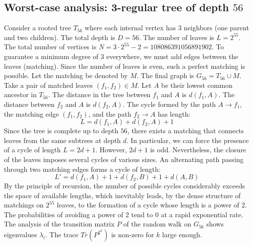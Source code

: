 \documentclass[11pt,a4paper]{article}
\begin{document}
\subsection{Worst-case analysis: 3-regular tree of depth $56$}
Consider a rooted tree $T_{56}$ where each internal vertex has 3 neighbors (one parent and two children).
The total depth is $D = 56$.
The number of leaves is $L = 2^{55}$.
The total number of vertices is $N = 3 \cdot 2^{55} - 2 = 108086391056891902$.
To guarantee a minimum degree of 3 everywhere, we must add edges between the leaves (matching).
Since the number of leaves is even, such a perfect matching is possible.
Let the matching be denoted by $M$. The final graph is $G_{56} = T_{56} \cup M$.
Take a pair of matched leaves $(f_1, f_2) \in M$.
Let $A$ be their lowest common ancestor in $T_{56}$.
The distance in the tree between $f_1$ and $A$ is $d(f_1, A)$.
The distance between $f_2$ and $A$ is $d(f_2, A)$.
The cycle formed by the path $A \to f_1$, the matching edge $(f_1, f_2)$, and the path $f_2 \to A$ has length:
$$ L = d(f_1, A) + d(f_2, A) + 1 $$
Since the tree is complete up to depth $56$, there exists a matching that connects leaves from the same subtrees at depth $d$.
In particular, we can force the presence of a cycle of length $L = 2d + 1$. However, $2d+1$ is odd.
Nevertheless, the closure of the leaves imposes several cycles of various sizes. An alternating path passing through two matching edges forms a cycle of length:
$$ L' = d(f_1, A) + 1 + d(f_2, B) + 1 + d(A, B) $$
By the principle of recursion, the number of possible cycles considerably exceeds the space of available lengths, which inevitably leads, by the dense structure of matchings on $2^{55}$ leaves, to the formation of a cycle whose length is a power of 2. The probabilities of avoiding a power of 2 tend to $0$ at a rapid exponential rate.
The analysis of the transition matrix $P$ of the random walk on $G_{56}$ shows eigenvalues $\lambda_i$. The trace $Tr(P^{2^k})$ is non-zero for $k$ large enough.
\end{document}
